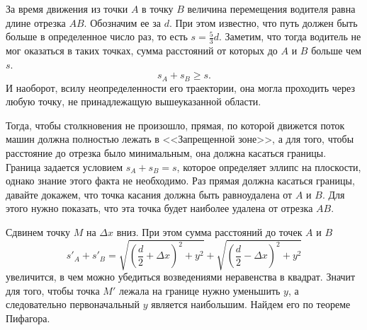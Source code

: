 	За время движения из точки $A$ в точку $B$ величина перемещения водителя равна длине отрезка $AB$. Обозначим ее за $d$. При этом известно, что путь должен быть больше в определенное число раз, то есть $s = \frac{5}{3}d$. Заметим, что тогда водитель не мог оказаться в таких точках, сумма расстояний от которых до $A$ и $B$ больше чем $s$. 
	\[
		s_A + s_B \geqslant s.
	\]
	И наоборот, всилу неопределенности его траектории, она могла проходить через любую точку, не принадлежащую вышеуказанной области. 
	\begin{figure}[h!]
		\centering
	\end{figure}
	
	Тогда, чтобы столкновения не произошло, прямая, по которой движется поток машин должна полностью лежать в <<Запрещенной зоне>>, а для того, чтобы расстояние до отрезка было минимальным, она должна касаться границы. Граница задается условием $s_A + s_B = s$, которое определяет эллипс на плоскости, однако знание этого факта не необходимо. Раз прямая должна касаться границы, давайте докажем, что точка касания должна быть равноудалена от $A$ и $B$. Для этого нужно показать, что эта точка будет наиболее удалена от отрезка $AB$.
	\begin{figure}[h!]
		\centering
	\end{figure}
	
	Сдвинем точку $M$ на $\Delta x$ вниз. При этом сумма расстояний до точек $A$ и $B$
	\[
		s'_A + s'_B = \sqrt{\left(\frac{d}{2}+\Delta x \right)^2 + y^2} + \sqrt{\left(\frac{d}{2}-\Delta x \right)^2 + y^2} 
	\]
	увеличится, в чем можно убедиться возведениями неравенства в квадрат. Значит для того, чтобы точка $M'$ лежала на границе нужно уменьшить $y$, а следовательно первоначальный $y$ является наибольшим. Найдем его по теореме Пифагора. \\
